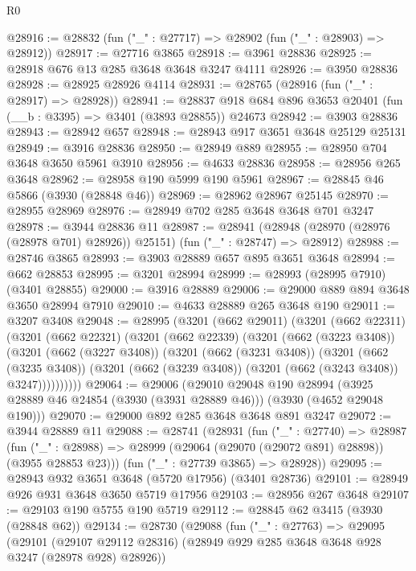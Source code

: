 \begin{lexlean}{R0}
\begin{coremodule}
@28916 := @28832 (fun ("_" : @27717) => @28902 (fun ("_" : @28903) => @28912))
@28917 := @27716 @3865
@28918 := @3961 @28836
@28925 := @28918 @676 @13 @285 @3648 @3648 @3247 @4111
@28926 := @3950 @28836
@28928 := @28925 @28926 @4114
@28931 := @28765 (@28916 (fun ("_" : @28917) => @28928))
@28941 := @28837 @918 @684 @896 @3653 @20401 (fun (__b : @3395) => @3401 (@3893 @28855)) @24673
@28942 := @3903 @28836
@28943 := @28942 @657
@28948 := @28943 @917 @3651 @3648 @25129 @25131
@28949 := @3916 @28836
@28950 := @28949 @889
@28955 := @28950 @704 @3648 @3650 @5961 @3910
@28956 := @4633 @28836
@28958 := @28956 @265 @3648
@28962 := @28958 @190 @5999 @190 @5961
@28967 := @28845 @46 @5866 (@3930 (@28848 @46))
@28969 := @28962 @28967 @25145
@28970 := @28955 @28969
@28976 := @28949 @702 @285 @3648 @3648 @701 @3247
@28978 := @3944 @28836 @11
@28987 := @28941
    (@28948 (@28970 (@28976 (@28978 @701) @28926)) @25151)
    (fun ("_" : @28747) => @28912)
@28988 := @28746 @3865
@28993 := @3903 @28889 @657 @895 @3651 @3648
@28994 := @662 @28853
@28995 := @3201 @28994
@28999 := @28993 (@28995 @7910) (@3401 @28855)
@29000 := @3916 @28889
@29006 := @29000 @889 @894 @3648 @3650 @28994 @7910
@29010 := @4633 @28889 @265 @3648 @190
@29011 := @3207 @3408
@29048 := @28995
    (@3201
      (@662 @29011)
      (@3201
        (@662 @22311)
        (@3201
          (@662 @22321)
          (@3201
            (@662 @22339)
            (@3201
              (@662 (@3223 @3408))
              (@3201
                (@662 (@3227 @3408))
                (@3201
                  (@662 (@3231 @3408))
                  (@3201
                    (@662 (@3235 @3408))
                    (@3201 (@662 (@3239 @3408)) (@3201 (@662 (@3243 @3408)) @3247))))))))))
@29064 := @29006
    (@29010
      @29048
      @190
      @28994
      (@3925 @28889 @46 @24854 (@3930 (@3931 @28889 @46)))
      (@3930 (@4652 @29048 @190)))
@29070 := @29000 @892 @285 @3648 @3648 @891 @3247
@29072 := @3944 @28889 @11
@29088 := @28741
    (@28931
      (fun ("_" : @27740) =>
      @28987
        (fun ("_" : @28988) => @28999 (@29064 (@29070 (@29072 @891) @28898)) (@3955 @28853 @23)))
      (fun ("_" : @27739 @3865) => @28928))
@29095 := @28943 @932 @3651 @3648 (@5720 @17956) (@3401 @28736)
@29101 := @28949 @926 @931 @3648 @3650 @5719 @17956
@29103 := @28956 @267 @3648
@29107 := @29103 @190 @5755 @190 @5719
@29112 := @28845 @62 @3415 (@3930 (@28848 @62))
@29134 := @28730
    (@29088
      (fun ("_" : @27763) =>
      @29095
        (@29101
          (@29107 @29112 @28316)
          (@28949 @929 @285 @3648 @3648 @928 @3247 (@28978 @928) @28926))

\end{coremodule}
\end{lexlean}
